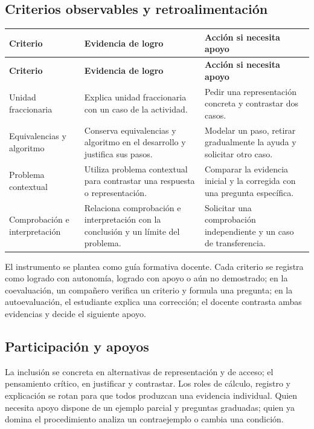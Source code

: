 \documentclass[spanish,letterpaper,oneside]{article}
\begin{document}
\subsection{Criterios observables y retroalimentación}

{\small{}\renewcommand{\arraystretch}{1.25}
\begin{longtable}{|>{\raggedright\arraybackslash}p{}|>{\raggedright\arraybackslash}p{}|>{\raggedright\arraybackslash}p{}|}\hline
\rowcolor{iiiepePale} \textbf{Criterio} & \textbf{Evidencia de logro} & \textbf{Acción si necesita apoyo} \\\hline
\endfirsthead
\hline
\rowcolor{iiiepePale} \textbf{Criterio} & \textbf{Evidencia de logro} & \textbf{Acción si necesita apoyo} \\\hline
\endhead
Unidad fraccionaria & Explica unidad fraccionaria con un caso de la actividad. & Pedir una representación concreta y contrastar dos casos. \\\hline
Equivalencias y algoritmo & Conserva equivalencias y algoritmo en el desarrollo y justifica sus pasos. & Modelar un paso, retirar gradualmente la ayuda y solicitar otro caso. \\\hline
Problema contextual & Utiliza problema contextual para contrastar una respuesta o representación. & Comparar la evidencia inicial y la corregida con una pregunta específica. \\\hline
Comprobación e interpretación & Relaciona comprobación e interpretación con la conclusión y un límite del problema. & Solicitar una comprobación independiente y un caso de transferencia. \\\hline
\end{longtable}}
El instrumento se plantea como guía formativa docente. Cada criterio se registra como logrado con autonomía, logrado con apoyo o aún no demostrado; en la coevaluación, un compañero verifica un criterio y formula una pregunta; en la autoevaluación, el estudiante explica una corrección; el docente contrasta ambas evidencias y decide el siguiente apoyo.\subsection{Participación y apoyos}
La inclusión se concreta en alternativas de representación y de acceso; el pensamiento crítico, en justificar y contrastar. Los roles de cálculo, registro y explicación se rotan para que todos produzcan una evidencia individual. Quien necesita apoyo dispone de un ejemplo parcial y preguntas graduadas; quien ya domina el procedimiento analiza un contraejemplo o cambia una condición.
\end{document}
